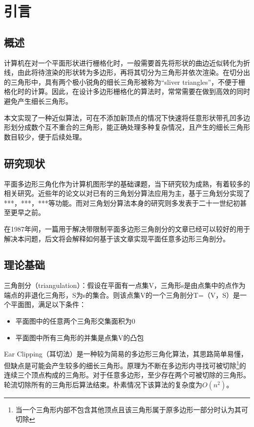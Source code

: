 
\chapter{引言}

\section{概述}
  计算机在对一个平面形状进行栅格化时，一般需要首先将形状的曲边近似转化为折线，由此将待渲染的形状转为多边形，再将其切分为三角形并依次渲染。在切分出的三角形中，具有两个极小锐角的细长三角形被称为“sliver triangles”，不便于栅格化时的计算。因此，在设计多边形栅格化的算法时，常常需要在做到高效的同时避免产生细长三角形。

  本文实现了一种近似算法，可在不添加新顶点的情况下快速将任意形状带孔凹多边形划分成数个互不重合的三角形，能正确处理多种复杂情况，且产生的细长三角形数目较少，便于后续处理。
\section{研究现状}

平面多边形三角化作为计算机图形学的基础课题，当下研究较为成熟，有着较多的相关研究。近些年的论文以对已有的三角划分算法应用为主，基于三角划分实现了***，***，***等功能。而对三角划分算法本身的研究则多发表于二十一世纪初甚至更早之前。

在1987年间，一篇用于解决带限制平面多边形三角剖分的文章已经可以较好的用于解决本问题，后文将会解释如何基于该文章实现平面任意多边形三角剖分。

\section{理论基础}
三角剖分（triangulation）：假设在平面有一点集V，三角形s是由点集中的点作为端点的非退化三角形，S为s的集合。则该点集V的一个三角剖分T=（V，S）是一个平面图，满足以下条件：
\begin{itemize}
  \item 平面图中的任意两个三角形交集面积为0
  \item 平面图中所有三角形的并集是点集V的凸包
\end{itemize}

Ear Clipping（耳切法）是一种较为简易的多边形三角化算法，其思路简单易懂，但缺点是可能会产生较多的细长三角形。原理为不断在多边形内寻找可被切除\footnote[1]{当一个三角形内部不包含其他顶点且该三角形属于原多边形一部分时认为其可切除}的连续三个顶点构成的三角形。对于任意多边形，至少存在两个可被切除的三角形。轮流切除所有的三角形后算法结束。朴素情况下该算法的复杂度为\(O(n^2)\)。

